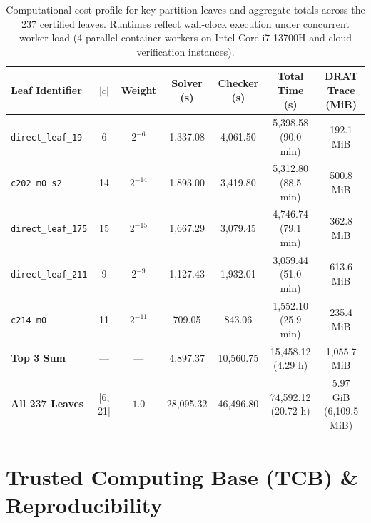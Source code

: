 \documentclass[11pt,a4paper]{article}
\theoremstyle{definition}
\begin{document}
\begin{table}[h!]
\centering
\footnotesize
\setlength{\tabcolsep}{3.5pt}
\begin{tabular}{lcccccc}
\toprule
\textbf{Leaf Identifier} & $|c|$ & \textbf{Weight} & \textbf{Solver (s)} & \textbf{Checker (s)} & \textbf{Total Time (s)} & \textbf{DRAT Trace (MiB)} \\
\midrule
\texttt{direct\_leaf\_19}   & 6  & $2^{-6}$  & 1,337.08 & 4,061.50 & 5,398.58 (90.0 min) & 192.1 MiB \\
\texttt{c202\_m0\_s2}       & 14 & $2^{-14}$ & 1,893.00 & 3,419.80 & 5,312.80 (88.5 min) & 500.8 MiB \\
\texttt{direct\_leaf\_175}  & 15 & $2^{-15}$ & 1,667.29 & 3,079.45 & 4,746.74 (79.1 min) & 362.8 MiB \\
\texttt{direct\_leaf\_211}  & 9  & $2^{-9}$  & 1,127.43 & 1,932.01 & 3,059.44 (51.0 min) & 613.6 MiB \\
\texttt{c214\_m0}           & 11 & $2^{-11}$ &   709.05 &   843.06 & 1,552.10 (25.9 min) & 235.4 MiB \\
\midrule
\textbf{Top 3 Sum}          & --- & --- & 4,897.37 & 10,560.75 & 15,458.12 (4.29 h) & 1,055.7 MiB \\
\textbf{All 237 Leaves}     & [6, 21] & $1.0$ & 28,095.32 & 46,496.80 & 74,592.12 (20.72 h) & 5.97 GiB (6,109.5 MiB) \\
\bottomrule
\end{tabular}
\caption{Computational cost profile for key partition leaves and aggregate totals across the 237 certified leaves. Runtimes reflect wall-clock execution under concurrent worker load (4 parallel container workers on Intel Core i7-13700H and cloud verification instances).}
\label{tab:leaf_cost}
\end{table}

\section{Trusted Computing Base (TCB) \& Reproducibility}
\end{document}
